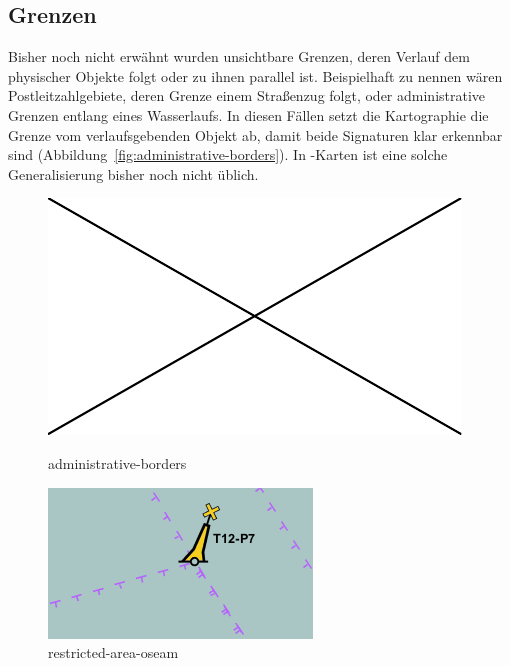\documentclass[../main/thesis.tex]{subfiles}
\begin{document}
\subsection{Grenzen}

Bisher noch nicht erwähnt wurden unsichtbare Grenzen, deren Verlauf dem physischer Objekte folgt oder zu ihnen parallel ist.
Beispielhaft zu nennen wären Postleitzahlgebiete, deren Grenze einem Straßenzug folgt, oder administrative Grenzen entlang eines Wasserlaufs.
In diesen Fällen setzt die Kartographie die Grenze vom verlaufsgebenden Objekt ab, damit beide Signaturen klar erkennbar sind (Abbildung~\ref{fig:administrative-borders}).
In \osm-Karten ist eine solche Generalisierung bisher noch nicht üblich.

\begin{figure}[ht]
  \begin{minipage}{.5\linewidth}
    \centering
    \includegraphics[width=\ScaleIfNeeded]{../image-missing}
    \caption{administrative-borders}\label{fig:administrative-borders}
  \end{minipage}%
  \begin{minipage}{.5\linewidth}
    \centering
    \includegraphics[width=\ScaleIfNeeded]{../chapter3/restricted-area-oseam}
    \caption{restricted-area-oseam}\label{fig:restricted-area-oseam}
  \end{minipage}
\end{figure}
\end{document}
